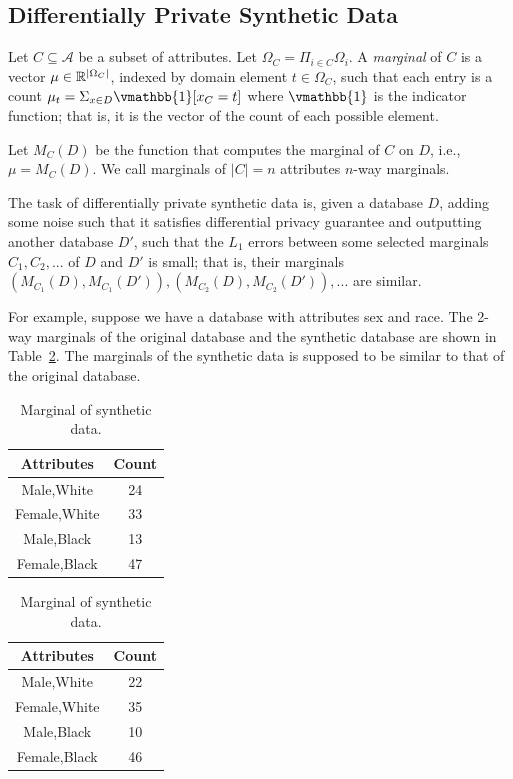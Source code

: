 \documentclass[acmsmall,sigconf]{acmart}
\DeclarePairedDelimiter{\abs}{\lvert}{\rvert}
\newcommand{\db}{D}
\begin{document}
\subsection{Differentially Private Synthetic Data}

Let $C \subseteq \mathcal{A}$ be a subset of attributes. Let $\Omega_C = \Pi_{i \in C} \Omega_i$. A \emph{marginal}\cite{barak2007privacy,mckenna2021winning} of $C$ is a vector $\mu \in \mathbb{R}^{\abs{\Omega_C}}$, indexed by domain element $t \in \Omega_C$, such that each entry is a count $\mu_t = \Sigma_{x \in \db} \vmathbb{1} [x_C = t]$ where $\vmathbb{1}$ is the indicator function; that is, it is the vector of the count of each possible element.

Let $M_C(\db)$ be the function that computes the marginal of $C$ on $\db$, i.e., $\mu = M_C(\db)$. We call marginals of $|C| = n$ attributes $n$-way marginals.

The task of differentially private synthetic data is, given a database $\db$, adding some noise such that it satisfies differential privacy guarantee and outputting another database $\db'$, such that the $L_1$ errors between some selected marginals $C_1,C_2,...$ of $\db$ and $\db'$ is small; that is, their marginals $(M_{C_1}(\db),M_{C_1}(\db')),(M_{C_2}(\db),M_{C_2}(\db')),...$ are similar.

For example, suppose we have a database with attributes sex and race. The 2-way marginals of the original database and the synthetic database are shown in Table~\ref{tab:marginal-example}. The marginals of the synthetic data is supposed to be similar to that of the original database.

\begin{table}[h]
\caption{Example marginals.}
\label{tab:marginal-example}
\centering
\begin{subtable}[t]{0.45\linewidth}
\centering
\caption{Marginal of original data.}
\begin{tabular}{cc}
\toprule
Attributes & Count \\
\midrule
Male,White & 24 \\
Female,White & 33 \\
Male,Black & 13 \\
Female,Black & 47 \\
\bottomrule
\end{tabular}
\end{subtable}
\hspace{0.05\linewidth}
\begin{subtable}[t]{0.45\linewidth}
\centering
\caption{Marginal of synthetic data.}
\begin{tabular}{cc}
\toprule
Attributes & Count \\
\midrule
Male,White & 22 \\
Female,White & 35 \\
Male,Black & 10 \\
Female,Black & 46 \\
\bottomrule
\end{tabular}
\end{subtable}
\end{table}
\end{document}
